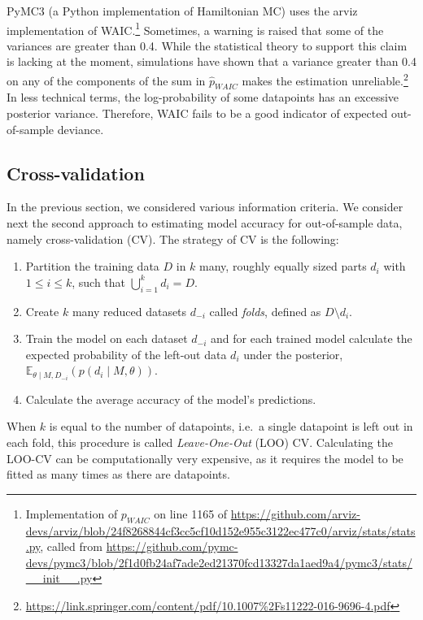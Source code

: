 \documentclass[a4paper,12pt,twoside]{article}
\begin{document}
PyMC3 (a Python implementation of Hamiltonian MC) uses the arviz implementation of WAIC.\footnote{Implementation of $p_{WAIC}$ on line 1165 of \url{https://github.com/arviz-devs/arviz/blob/24f8268844cf3cc5cf10d152e955c3122ec477c0/arviz/stats/stats.py}, called from \url{https://github.com/pymc-devs/pymc3/blob/2f1d0fb24af7ade2ed21370fcd13327da1aed9a4/pymc3/stats/__init__.py}} Sometimes, a warning is raised that some of the variances are greater than 0.4. While the statistical theory to support this claim is lacking at the moment, simulations have shown that a variance greater than 0.4 on any of the components of the sum in $\hat{p}_{WAIC}$ makes the estimation unreliable.\footnote{\url{https://link.springer.com/content/pdf/10.1007\%2Fs11222-016-9696-4.pdf}} In less technical terms, the log-probability of some datapoints has an excessive posterior variance. Therefore, WAIC fails to be a good indicator of expected out-of-sample deviance.

\subsection{Cross-validation}

In the previous section, we considered various information criteria. We consider next the second approach to estimating model accuracy for out-of-sample data, namely cross-validation (CV). The strategy of CV is the following:
\begin{enumerate}
\item Partition the training data $D$ in $k$ many, roughly equally sized parts $ d_i $ with $1 \leq i \leq k$, such that $\bigcup_{i=1}^{k} d_i = D$.
\item Create $k$ many reduced datasets $d_{-i}$ called \textit{folds}, defined as $D \setminus d_i$.
\item Train the model on each dataset $d_{-i}$ and for each trained model calculate the expected probability of the left-out data $d_i$ under the posterior, $\mathbb{E}_{\theta \mid M, D_{-i}}(p(d_i \mid M, \theta))$.
\item Calculate the average accuracy of the model's predictions.
\end{enumerate}
When $k$ is equal to the number of datapoints, i.e.\ a single datapoint is left out in each fold, this procedure is called \textit{Leave-One-Out} (LOO) CV. Calculating the LOO-CV can be computationally very expensive, as it requires the model to be fitted as many times as there are datapoints. 
\end{document}
